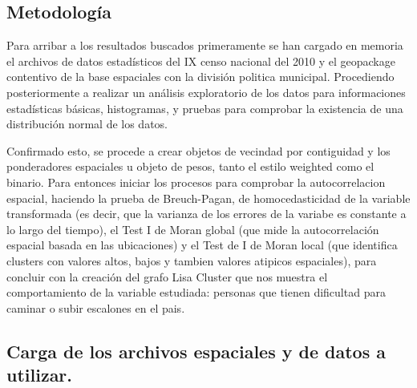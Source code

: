 \documentclass[11pt,]{article}
\begin{document}
\subsection{Metodología}\label{metodologuxeda}

Para arribar a los resultados buscados primeramente se han cargado en
memoria el archivos de datos estadísticos del IX censo nacional del 2010
y el geopackage contentivo de la base espaciales con la división
politica municipal. Procediendo posteriormente a realizar un análisis
exploratorio de los datos para informaciones estadísticas básicas,
histogramas, y pruebas para comprobar la existencia de una distribución
normal de los datos.

Confirmado esto, se procede a crear objetos de vecindad por contiguidad
y los ponderadores espaciales u objeto de pesos, tanto el estilo
weighted como el binario. Para entonces iniciar los procesos para
comprobar la autocorrelacion espacial, haciendo la prueba de
Breuch-Pagan, de homocedasticidad de la variable transformada (es decir,
que la varianza de los errores de la variabe es constante a lo largo del
tiempo), el Test I de Moran global (que mide la autocorrelación espacial
basada en las ubicaciones) y el Test de I de Moran local (que identifica
clusters con valores altos, bajos y tambien valores atipicos
espaciales), para concluir con la creación del grafo Lisa Cluster que
nos muestra el comportamiento de la variable estudiada: personas que
tienen dificultad para caminar o subir escalones en el pais.

\subsection{Carga de los archivos espaciales y de datos a
utilizar.}\label{carga-de-los-archivos-espaciales-y-de-datos-a-utilizar.}
\end{document}
